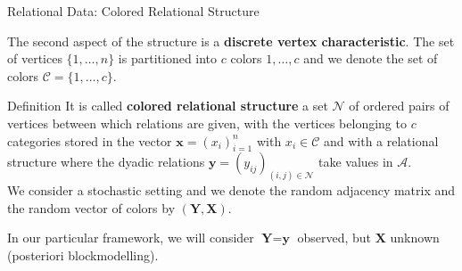 \documentclass[aspectratio=169,xcolor=dvipsnames]{beamer}
\newcommand{\setn}{\mathcal{N}}
\newcommand{\seta}{\mathcal{A}}
\newcommand{\setc}{\mathcal{C}}
\newcommand{\vecx}{\textbf{x}}
\newcommand{\vecy}{\textbf{y}}
\newcommand{\matx}{\textbf{X}}
\newcommand{\maty}{\textbf{Y}}
\begin{document}
\begin{frame}{{Relational Data: Colored Relational Structure}}

The second aspect of the structure is a \textbf{discrete vertex characteristic}. The set of vertices $\{1, \dots ,n\}$ is partitioned into $c$ colors $1, \dots, c$ and we denote the set of colors $\setc = \{1, \dots ,c\}$.
\pause
\vspace{5pt}
\begin{block}{Definition}
It is called \textbf{colored relational structure} a set $\setn$ of ordered pairs of vertices between which relations are given, with the vertices belonging to $c$ categories stored in the vector $\vecx = (x_i)^n_{i=1}$ with $x_i \in \setc$ and with a relational structure where the dyadic relations $\vecy = (y_{ij})_{(i,j) \in \setn}$ take values in $\seta$.\\
 We consider a stochastic setting and we denote the random adjacency matrix and the random vector of colors by $(\maty, \matx)$.
\end{block}
\pause
\vspace{5pt}
In our particular framework,  we will consider $\maty = \vecy$ observed, but $\matx$ unknown (posteriori blockmodelling).

\end{frame}

\end{document}
